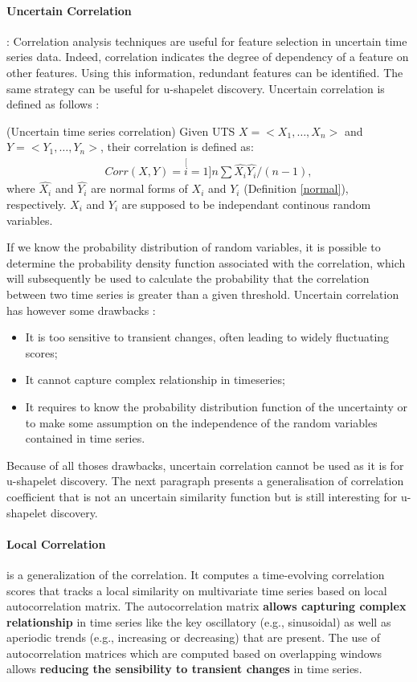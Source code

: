 \paragraph{Uncertain Correlation} \cite{Orang2017} : 
Correlation analysis techniques are useful for feature selection in uncertain time series data. Indeed, correlation indicates the degree of dependency of a feature on other features. Using this information, redundant features can be identified. The same strategy can be useful for  u-shapelet discovery.  Uncertain
correlation is defined as follows : 


\begin{definition}
(Uncertain time series correlation) Given UTS  $X = <X_1, \ldots, X_n>$ and  $Y = <Y_1, \ldots, Y_n>$, their correlation is defined as:
\begin{eqnarray}
Corr(X,Y)=\stackrel[i=1]{n}{\sum}\hat{X_{i}}\hat{Y_{i}}/(n-1),
\end{eqnarray}
where $\hat{X_{i}}$ and
$\hat{Y_{i}}$ are normal forms of $X_i$ and $Y_i$ (Definition \ref{normal}), respectively. $X_i$ and $Y_i$ are supposed to be independant continous random variables.
\end{definition}
If we know the probability distribution of random variables, it is possible to determine the probability density function associated with the correlation, which will subsequently be used to calculate the probability that the correlation between two time series is greater than a given threshold.   
Uncertain correlation has however some drawbacks :
\begin{itemize}
\item It is too sensitive to transient changes, often leading to widely fluctuating scores;
\item It cannot capture complex relationship in timeseries;
\item It requires to know the probability distribution function of the uncertainty or to make some assumption on the independence of the random variables  contained in time series.

\end{itemize}
Because of all thoses drawbacks, uncertain correlation cannot be used as it is for u-shapelet discovery. The next paragraph presents a generalisation of correlation coefficient that is not an uncertain similarity function but is still interesting for u-shapelet discovery.

\paragraph{Local Correlation} \cite{papadimitriou2006local} is a
generalization of the correlation. It computes a time-evolving correlation scores that tracks a local similarity on multivariate time series based on local autocorrelation matrix. The autocorrelation matrix \textbf{allows capturing complex relationship} in time series like the key oscillatory (e.g., sinusoidal) as well as aperiodic trends (e.g., increasing or decreasing)  that are present. The use of  autocorrelation
matrices which are computed based on overlapping windows allows \textbf{reducing the sensibility to transient changes} in time series.


